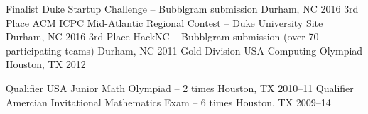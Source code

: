 \begin{cvhonors}
  \cvhonor
    {Finalist}
    {Duke Startup Challenge -- Bubblgram submission}
    {Durham, NC}
    {2016}
  \cvhonor
    {3rd Place}
    {ACM ICPC Mid-Atlantic Regional Contest -- Duke University Site}
    {Durham, NC}
    {2016}
  \cvhonor
    {3rd Place}
    {HackNC -- Bubblgram submission (over 70 participating teams)}
    {Durham, NC}
    {2011}
  \cvhonor
    {Gold Division}
    {USA Computing Olympiad}
    {Houston, TX}
    {2012}
\end{cvhonors}

\begin{cvhonors}
  \cvhonor
    {Qualifier}
    {USA Junior Math Olympiad -- 2 times}
    {Houston, TX}
    {2010--11}
  \cvhonor
    {Qualifier}
    {Amercian Invitational Mathematics Exam -- 6 times}
    {Houston, TX}
    {2009--14}
\end{cvhonors}
